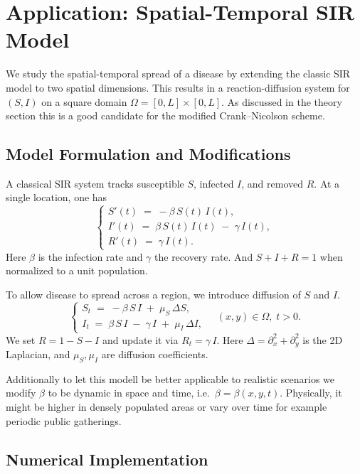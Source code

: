 \section{Application: Spatial-Temporal SIR Model}

We study the spatial-temporal spread of a disease by extending the classic SIR model to two spatial dimensions. 
This results in a reaction-diffusion system for \((S,I)\) on a square domain \(\Omega = [0,L]\times [0,L]\). As
discussed in the theory section this is a good candidate for the modified Crank--Nicolson scheme.

\subsection{Model Formulation and Modifications}

A classical SIR system tracks susceptible \(S\), infected \(I\), and removed \(R\). 
At a single location, one has
\[
  \begin{cases}
    S'(t) \;=\; -\beta\,S(t)\,I(t),\\[4pt]
    I'(t) \;=\; \beta\,S(t)\,I(t)\;-\;\gamma\,I(t),\\[4pt]
    R'(t) \;=\;\gamma\,I(t).
  \end{cases}
\]
Here \(\beta\) is the infection rate and \(\gamma\) the recovery rate. And \(S+I+R=1\) when normalized to a 
unit population.

To allow disease to spread across a region, we introduce diffusion of \(S\) and \(I\).
\[
  \begin{cases}
    S_t \;=\; -\beta\,S\,I \;+\;\mu_S\,\Delta S,\\[6pt]
    I_t \;=\; \beta\,S\,I \;-\;\gamma\,I \;+\;\mu_I\,\Delta I,
  \end{cases}
  \quad (x,y)\in\Omega,\;t>0.
\]
We set \(R=1-S-I\) and update it via \(R_t = \gamma\,I\). Here \(\Delta = \partial_x^2 + \partial_y^2\) is the 2D 
Laplacian, and \(\mu_S,\mu_I\) are diffusion coefficients.


Additionally to let this modell be better applicable to realistic scenarios we modify \(\beta\) to be dynamic in 
space and time, i.e.\ \(\beta = \beta(x,y,t)\). Physically, it might be higher in densely populated areas or 
vary over time for example periodic public gatherings.

\subsection{Numerical Implementation}

